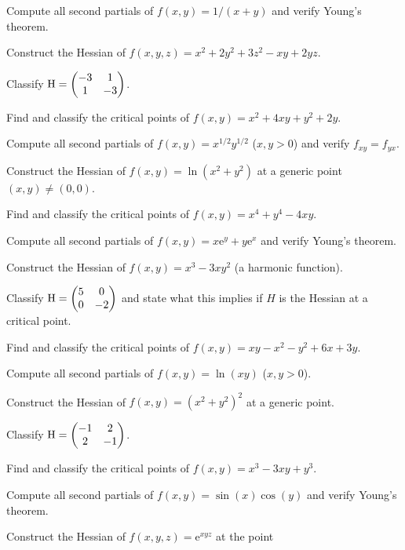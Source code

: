 \begin{problems}
  \item Compute all second partials of $f(x,y) = 1/(x+y)$ and verify
        Young's theorem.
  \item Construct the Hessian of
        $f(x,y,z) = x^{2} + 2y^{2} + 3z^{2} - xy + 2yz$.
  \item Classify $\operatorname{H} = \begin{pmatrix}-3&1\\1&-3\end{pmatrix}$.
  \item Find and classify the critical points of
        $f(x,y) = x^{2} + 4xy + y^{2} + 2y$.
  \item Compute all second partials of $f(x,y) = x^{1/2}y^{1/2}$
        ($x,y>0$) and verify $f_{xy} = f_{yx}$.
  \item Construct the Hessian of $f(x,y) = \ln(x^{2}+y^{2})$ at a generic
        point $(x,y)\neq(0,0)$.
  \item Find and classify the critical points of
        $f(x,y) = x^{4} + y^{4} - 4xy$.
  \item Compute all second partials of $f(x,y) = x\mathrm{e}^{y} + y\mathrm{e}^{x}$
        and verify Young's theorem.
  \item Construct the Hessian of $f(x,y) = x^{3} - 3xy^{2}$ (a harmonic
        function).
  \item Classify $\operatorname{H} = \begin{pmatrix}5&0\\0&-2\end{pmatrix}$ and state
        what this implies if $H$ is the Hessian at a critical point.
  \item Find and classify the critical points of
        $f(x,y) = xy - x^{2} - y^{2} + 6x + 3y$.
  \item Compute all second partials of $f(x,y) = \ln(xy)$ ($x,y>0$).
  \item Construct the Hessian of $f(x,y) = (x^{2}+y^{2})^{2}$ at a generic
        point.
  \item Classify $\operatorname{H} = \begin{pmatrix}-1&2\\2&-1\end{pmatrix}$.
  \item Find and classify the critical points of
        $f(x,y) = x^{3} - 3xy + y^{3}$.
  \item Compute all second partials of $f(x,y) = \sin(x)\cos(y)$ and
        verify Young's theorem.
  \item Construct the Hessian of $f(x,y,z) = \mathrm{e}^{xyz}$ at the point

\end{problems}
